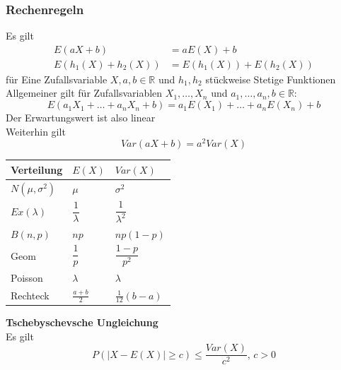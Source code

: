 \documentclass[
	ngerman,
	accentcolor=9c,%
	type=intern,
	marginpar=false
	]{tudapub}
\begin{document}
            \subsubsection{Rechenregeln}
                Es gilt
                \begin{align*}
                    E(aX + b) &= aE(X)+ b\\
                    E(h_1(X)+h_2(X)) &= E(h_1(X))+E(h_2(X))
                \end{align*}
                für Eine Zufallsvariable $X, a, b \in \mathbb{R}$ und $h_1, h_2$ stückweise Stetige Funktionen\\
                Allgemeiner gilt für Zufallsvariablen $X_1,\dots, X_n$ und $a_1, \dots, a_n, b \in \mathbb{R}$:
                \begin{equation*}
                    E(a_1X_1 + \dots + a_nX_n + b) = a_1E(X_1)+\dots+a_nE(X_n) + b
                \end{equation*} 
                Der Erwartungswert ist also linear\\
                Weiterhin gilt
                \begin{equation*}
                    Var(aX + b) = a^2 Var(X)
                \end{equation*}
                \begin{center}
                    \begin{tabular}{l l l}
                        \hline
                        Verteilung & $E(X)$ & $Var(X)$\\
                        \hline
                        $N(\mu, \sigma^2)$ & $\mu$ & $\sigma^2$\\
                        $Ex(\lambda)$ & $\dfrac{1}{\lambda}$ & $\dfrac{1}{\lambda^2}$\\
                        $B(n,p)$ & $np$ & $np(1-p)$\\
                        Geom & $\dfrac{1}{p}$& $\dfrac{1-p}{p^2}$\\
                        Poisson & $\lambda$ & $\lambda$\\
                        Rechteck & $\frac{a+b}{2}$ & $\frac{1}{12}(b-a)$\\
                        \hline
                    \end{tabular}
                \end{center}
                \textbf{Tschebyschevsche Ungleichung}\\
                Es gilt
                \begin{equation*}
                    P(|X-E(X)| \geq c) \leq \dfrac{Var(X)}{c^2}\mbox{, } c>0
                \end{equation*}
\end{document}
